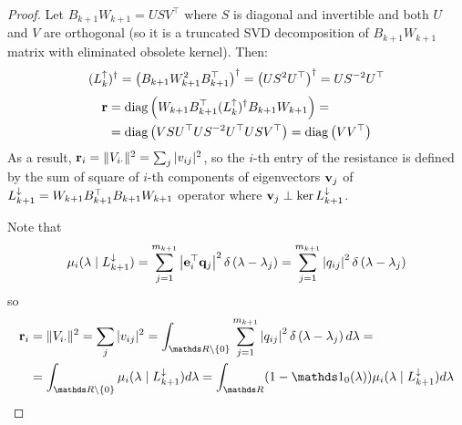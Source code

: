 \documentclass{mynotes}
\begin{document}
\begin{proof}
      Let \( B_{k+1} W_{k+1} = U S V^\top\) where \( S \) is diagonal and invertible and both \( U \) and \( V \) are orthogonal (so it is a truncated SVD decomposition of \( B_{k+1} W_{k+1} \) matrix with eliminated obsolete kernel). Then:
      \begin{equation}
            ( L_{k}^{\uparrow} )^\dagger = \left( B_{k+1} W_{k+1}^2 B_{k+1}^\top \right)^\dagger = \left( U S^2 U^\top \right)^\dagger = U S^{-2} U^\top
      \end{equation}
      \begin{equation}
            \begin{aligned}
                  \mathbf{r} & = \operatorname{diag} \left( W_{k+1} B_{k+1}^\top ( L_{k}^{\uparrow} )^\dagger B_{k+1} W_{k+1} \right)  =  \\
                  & = \operatorname{diag} \left(  V S U^\top U S^{-2} U^\top U S V^\top \right) = \operatorname{diag} \left(  V V^\top \right)
            \end{aligned}
      \end{equation}
      As a result, \( \mathbf{r}_i = \| V_{ i \cdot } \|^2 = \sum_j | v_{ij} |^2  \), so the \(i\)-th entry of the resistance is defined by the sum of square of \(i\)-th components of eigenvectors \( \mathbf{v}_j \) of \( L_{k+1}^{\downarrow} = W_{k+1} B_{k+1}^\top B_{k+1} W_{k+1} \) operator where \( \mathbf{v}_j \perp \ker L_{k+1}^{\downarrow} \).

      Note that 
      \begin{equation}
            \mu_i ( \lambda \mid L_{k+1}^{\downarrow} ) = \sum_{j=1}^{m_{k+1}} \left| \mathbf{e}_i^\top \mathbf{q}_j \right|^2 \delta \left( \lambda - \lambda_j \right)  = \sum_{j=1}^{m_{k+1}} \left| q_{ij} \right|^2 \delta \left( \lambda - \lambda_j \right) 
      \end{equation}
      so 
      \begin{equation}
            \begin{aligned}
                  \b r_i & = \| V_{ i \cdot } \|^2 = \sum_j | v_{ij} |^2 = \int_{ \ds R \backslash \{ 0 \} }  \sum_{j=1}^{m_{k+1}} \left| q_{ij} \right|^2 \delta \left( \lambda - \lambda_j \right)  d\lambda =\\
                  & = \int_{ \ds R \backslash \{ 0 \} } \mu_i ( \lambda \mid \Ld {k+1} ) d\lambda = \int_{\ds R } (1 - \ds 1_0(\lambda)) \mu_i ( \lambda \mid \Ld {k+1} ) d\lambda
            \end{aligned}
      \end{equation}
\end{proof}
\end{document}
